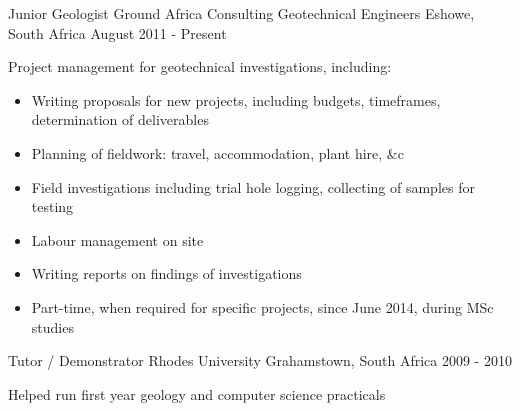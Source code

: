 \begin{cventries}
\cventry
{Junior Geologist} %
{Ground Africa Consulting Geotechnical Engineers} %
{Eshowe, South Africa} %
{August 2011 - Present} %
{ %
\begin{cvitems}
\item {Project management for geotechnical investigations, including:
\begin{itemize}
\item {Writing proposals for new projects, including budgets, timeframes, determination of deliverables}
\item {Planning of fieldwork: travel, accommodation, plant hire, \&c}
\item {Field investigations including trial hole logging, collecting of samples for testing}
\item {Labour management on site}
\item {Writing reports on findings of investigations}
\item {Part-time, when required for specific projects, since June 2014, during MSc studies}
\end{itemize}
}
\end{cvitems}
}


\cventry
{Tutor / Demonstrator} %
{Rhodes University} %
{Grahamstown, South Africa} %
{2009 - 2010} %
{ %
\begin{cvitems}
\item {Helped run first year geology and computer science practicals}
\end{cvitems}
}


\end{cventries}